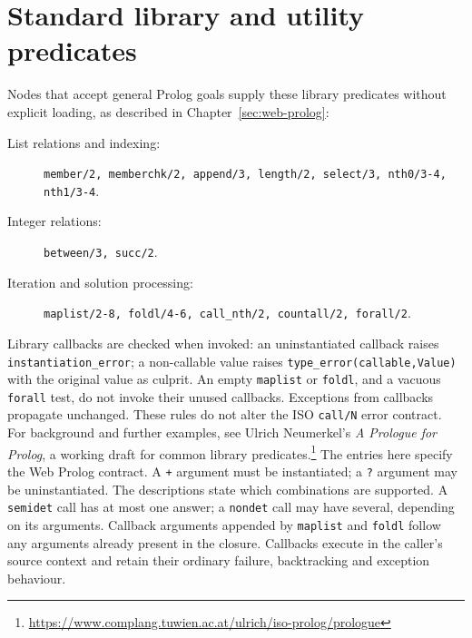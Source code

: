 \section{Standard library and utility predicates}\label{sec:manual-standard-library}

Nodes that accept general Prolog goals supply these library predicates
without explicit loading, as described in Chapter~\ref{sec:web-prolog}:

\begin{description}
\item[List relations and indexing:]
\texttt{member/\allowbreak{}2,\allowbreak{} memberchk/\allowbreak{}2,\allowbreak{} append/\allowbreak{}3,\allowbreak{} length/\allowbreak{}2,\allowbreak{} select/\allowbreak{}3,\allowbreak{}
nth0/\allowbreak{}3-4,\allowbreak{} nth1/\allowbreak{}3-4}.
\item[Integer relations:]
\texttt{between/\allowbreak{}3,\allowbreak{} succ/\allowbreak{}2}.
\item[Iteration and solution processing:]
\texttt{maplist/\allowbreak{}2-8,\allowbreak{} foldl/\allowbreak{}4-6,\allowbreak{} call\_\allowbreak{}nth/\allowbreak{}2,\allowbreak{} countall/\allowbreak{}2,\allowbreak{} forall/\allowbreak{}2}.
\end{description}

\noindent Library callbacks are checked when invoked: an uninstantiated callback raises
\texttt{instantiation\_error}; a non-callable value raises
\texttt{type\_error(callable,\allowbreak{}Value)} with the original value as culprit.
An empty \texttt{maplist} or \texttt{foldl}, and a vacuous \texttt{forall} test,
do not invoke their unused callbacks. Exceptions from callbacks propagate unchanged.
These rules do not alter the ISO \texttt{call/N} error contract.\\

For background and further examples, see Ulrich Neumerkel's
\emph{A Prologue for Prolog}, a working draft for common library predicates.\footnote{\url{https://www.complang.tuwien.ac.at/ulrich/iso-prolog/prologue}}
The entries here specify the Web Prolog contract. A \texttt{+} argument must be
instantiated; a \texttt{?} argument may be uninstantiated. The descriptions
state which combinations are supported. A \texttt{semidet} call has at most
one answer; a \texttt{nondet} call may have several, depending on its arguments.
Callback arguments appended by \texttt{maplist} and \texttt{foldl} follow any
arguments already present in the closure. Callbacks execute in the caller's
source context and retain their ordinary failure, backtracking and exception
behaviour.\\


